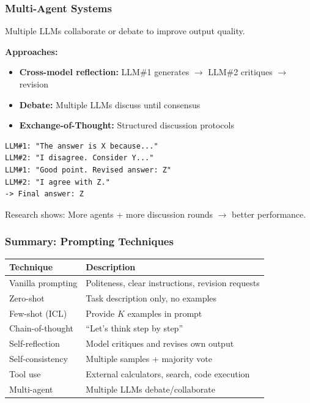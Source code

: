 \bigseparator

\subsubsection{Multi-Agent Systems}

\begin{defbox}
Multiple LLMs collaborate or debate to improve output quality.

\textbf{Approaches:}
\begin{itemize}
  \item \textbf{Cross-model reflection:} LLM\#1 generates $\to$ LLM\#2 critiques $\to$ revision
  \item \textbf{Debate:} Multiple LLMs discuss until consensus
  \item \textbf{Exchange-of-Thought:} Structured discussion protocols
\end{itemize}
\end{defbox}

\begin{exbox}
\begin{verbatim}
LLM#1: "The answer is X because..."
LLM#2: "I disagree. Consider Y..."
LLM#1: "Good point. Revised answer: Z"
LLM#2: "I agree with Z."
-> Final answer: Z
\end{verbatim}

Research shows: More agents + more discussion rounds $\to$ better performance.
\end{exbox}

\bigseparator

\subsubsection{Summary: Prompting Techniques}

\begin{center}
\renewcommand{\arraystretch}{1.3}
\begin{tabular}{@{} l p{8cm} @{}}
\toprule
\textbf{Technique} & \textbf{Description} \\
\midrule
Vanilla prompting & Politeness, clear instructions, revision requests \\
Zero-shot & Task description only, no examples \\
Few-shot (ICL) & Provide $K$ examples in prompt \\
Chain-of-thought & ``Let's think step by step'' \\
Self-reflection & Model critiques and revises own output \\
Self-consistency & Multiple samples + majority vote \\
Tool use & External calculators, search, code execution \\
Multi-agent & Multiple LLMs debate/collaborate \\
\bottomrule
\end{tabular}
\end{center}

